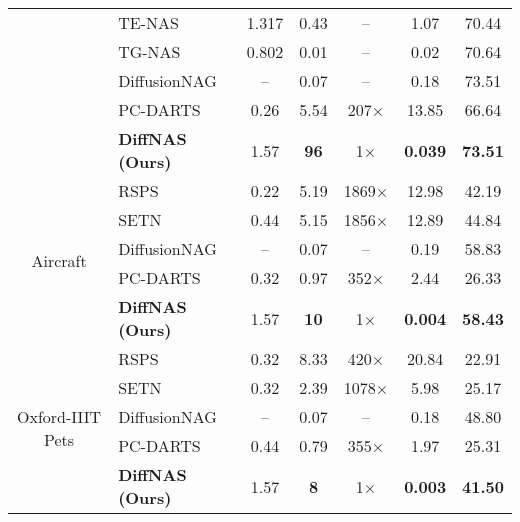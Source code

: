 \begin{table*}[t!]
\begin{center}
{\begin{tabular}{cl|ccccc}
                & TE-NAS             & 1.317  & 0.43  & –    & 1.07 & 70.44 \\
                & TG-NAS             & 0.802  & 0.01  & –    & 0.02 & 70.64 \\
                & DiffusionNAG       & –      & 0.07  & –    & 0.18 & 73.51 \\
                & PC-DARTS           & 0.26   & 5.54  & 207× & 13.85 & 66.64 \\
                & \textbf{DiffNAS (Ours)} & 1.57 & \textbf{96} & 1× & \textbf{0.039} & \textbf{73.51} \\
                \midrule
                \multirow{5}{*}{Aircraft}                 
                & RSPS               & 0.22   & 5.19  & 1869× & 12.98 & 42.19 \\
                & SETN               & 0.44   & 5.15  & 1856× & 12.89 & 44.84 \\
                & DiffusionNAG       & –      & 0.07  & –     & 0.19 & 58.83 \\
                & PC-DARTS           & 0.32   & 0.97  & 352×  & 2.44  & 26.33 \\
                & \textbf{DiffNAS (Ours)} & 1.57 & \textbf{10} & 1× & \textbf{0.004} & \textbf{58.43} \\
                \midrule
                \multirow{5}{*}{Oxford-IIIT Pets}         
                & RSPS               & 0.32   & 8.33  & 420×  & 20.84 & 22.91 \\
                & SETN               & 0.32   & 2.39  & 1078× & 5.98  & 25.17 \\
                & DiffusionNAG       & –      & 0.07  & –     & 0.18  & 48.80 \\
                & PC-DARTS           & 0.44   & 0.79  & 355×  & 1.97  & 25.31 \\
                & \textbf{DiffNAS (Ours)} & 1.57 & \textbf{8} & 1× & \textbf{0.003} & \textbf{41.50} \\
                \bottomrule
                \end{tabular}
                }
                \end{center}
                \small
                \label{tbl:main_nasbench201}
                \vspace{-0.15in}
                \end{table*}
                
